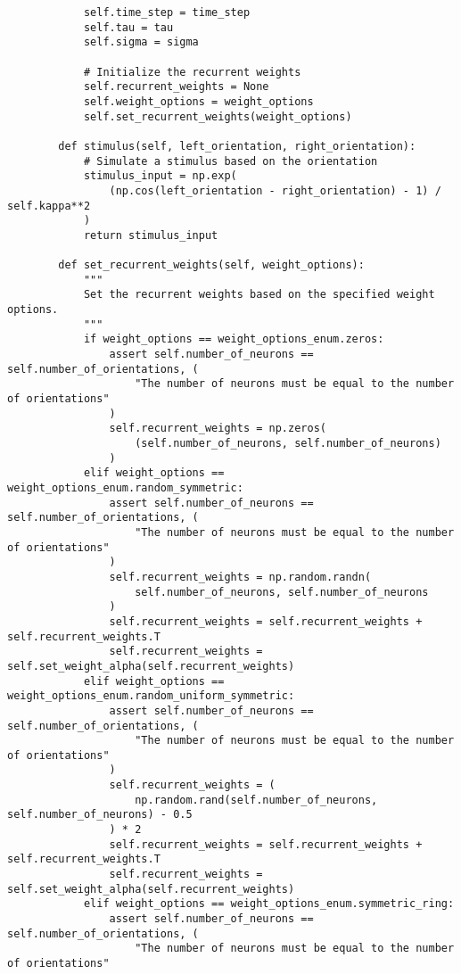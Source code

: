 \documentclass[a4paper, 11pt, oneside]{report}
\begin{document}
\begin{verbatim}
            self.time_step = time_step
            self.tau = tau
            self.sigma = sigma
    
            # Initialize the recurrent weights
            self.recurrent_weights = None
            self.weight_options = weight_options
            self.set_recurrent_weights(weight_options)
    
        def stimulus(self, left_orientation, right_orientation):
            # Simulate a stimulus based on the orientation
            stimulus_input = np.exp(
                (np.cos(left_orientation - right_orientation) - 1) / self.kappa**2
            )
            return stimulus_input
    
        def set_recurrent_weights(self, weight_options):
            """
            Set the recurrent weights based on the specified weight options.
            """
            if weight_options == weight_options_enum.zeros:
                assert self.number_of_neurons == self.number_of_orientations, (
                    "The number of neurons must be equal to the number of orientations"
                )
                self.recurrent_weights = np.zeros(
                    (self.number_of_neurons, self.number_of_neurons)
                )
            elif weight_options == weight_options_enum.random_symmetric:
                assert self.number_of_neurons == self.number_of_orientations, (
                    "The number of neurons must be equal to the number of orientations"
                )
                self.recurrent_weights = np.random.randn(
                    self.number_of_neurons, self.number_of_neurons
                )
                self.recurrent_weights = self.recurrent_weights + self.recurrent_weights.T
                self.recurrent_weights = self.set_weight_alpha(self.recurrent_weights)
            elif weight_options == weight_options_enum.random_uniform_symmetric:
                assert self.number_of_neurons == self.number_of_orientations, (
                    "The number of neurons must be equal to the number of orientations"
                )
                self.recurrent_weights = (
                    np.random.rand(self.number_of_neurons, self.number_of_neurons) - 0.5
                ) * 2
                self.recurrent_weights = self.recurrent_weights + self.recurrent_weights.T
                self.recurrent_weights = self.set_weight_alpha(self.recurrent_weights)
            elif weight_options == weight_options_enum.symmetric_ring:
                assert self.number_of_neurons == self.number_of_orientations, (
                    "The number of neurons must be equal to the number of orientations"

\end{verbatim}
\end{document}
